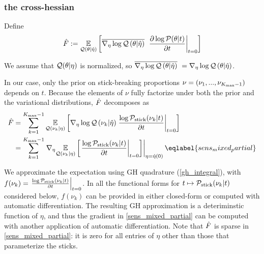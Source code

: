 
\subsubsection*{the cross-hessian}


Define
\begin{align*}
\hat F :=   \underset{\mathcal{Q}(\theta \vert \hat\eta)}{\mathbb{E}}\left[
      \overline{{\nabla_\eta \log \mathcal{Q}}\left(\theta \vert \hat\eta\right)}\,\,
      \left.\frac{\partial \log \mathcal{P}(\theta \vert t)}{\partial t}\right\vert_{t=0}
  \right]
\end{align*}


We assume that $\mathcal{Q}(\theta \vert \eta)$ is normalized, so
$\overline{{\nabla_\eta \log \mathcal{Q}}\left(\theta \vert \hat\eta\right)}\,\, = {\nabla_\eta \log \mathcal{Q}}\left(\theta \vert \hat\eta\right)$.

In our case, only the prior on stick-breaking proportions
$\nu = (\nu_1, ..., \nu_{{K_{\mathrm{max}}} - 1})$ depends on $t$.
Because the elements of $\nu$ fully factorize
under both the prior and the variational distributions,
$\hat F$ decomposes as
\begin{align}
  \crosshessian &=
  \sum_{\k=1}^{\kmax - 1}
          \expect{\q(\nuk \vert \eta)}
                 {
                 \lqgrad{\nuk \vert \etaopt}
                 \fracat{\log \pstick(\nuk \vert \t)}{\partial \t}{\t = 0}
                 } \notag\\
  &= \sum_{\k=1}^{\kmax - 1}
         \evalat{\nabla_\eta \expect{\q(\nuk \vert \eta)}
                {
                \fracat{\log \pstick(\nuk \vert \t)}{\partial \t}{\t = 0}
                }}{\eta = \etaopt(0)}
\eqlabel{sens_mixed_partial}
\end{align}

We approximate the expectation using GH quadrature (\eqref{gh_integral}),
with
$f(\nu_k) = \left.\frac{\log \mathcal{P}_{\mathrm{stick}}(\nu_{k} \vert t)}{\partial t}\right\vert_{t = 0}$.
In all the functional forms for
$t \mapsto \mathcal{P}_{\mathrm{stick}}(\nu_{k} \vert t)$ considered below,
$f(\nu_k)$ can be provided in either closed-form or computed with automatic differentiation.
The resulting GH approximation is a deteriminstic function of $\eta$,
and thus the gradient in \eqref{sens_mixed_partial} can be computed
with another application of automatic differentiation.
Note that $\hat F$ is sparse in \eqref{sens_mixed_partial}:
it is zero for all entries of
$\eta$ other than those that parameterize the sticks.

